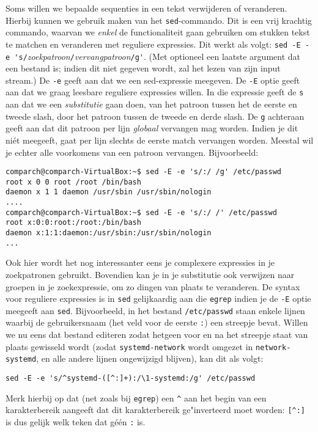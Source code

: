 \documentclass[a4paper,twoside,openany]{memoir}
\begin{document}
Soms willen we bepaalde sequenties in een tekst verwijderen of veranderen.
Hierbij kunnen we gebruik maken van het \verb!sed!-commando. Dit is een vrij
krachtig commando, waarvan we \emph{enkel} de functionaliteit gaan gebruiken om
stukken tekst te matchen en veranderen met reguliere expressies. Dit werkt als
volgt: \verb!sed -E -e 's/!\emph{zoekpatroon}\verb!/!\emph{vervangpatroon}\verb!/g'!. (Met optioneel
een laatste argument dat een bestand is; indien dit niet gegeven wordt, zal het
lezen van zijn input stream.) De \verb!-e! geeft aan dat we een sed-expressie
meegeven. De \verb!-E! optie geeft aan dat we graag leesbare reguliere expressies willen.
In die expressie geeft de \verb!s! aan dat we een \emph{substitutie}
gaan doen, van het patroon tussen het de eerste en tweede slash, door het
patroon tussen de tweede en derde slash. De \verb!g! achteraan geeft aan dat dit
patroon per lijn \emph{globaal} vervangen mag worden. Indien je dit niét
meegeeft, gaat per lijn slechts de eerste match vervangen worden. Meestal wil je
echter alle voorkomens van een patroon vervangen. Bijvoorbeeld:

\begin{verbatim}
comparch@comparch-VirtualBox:~$ sed -E -e 's/:/ /g' /etc/passwd
root x 0 0 root /root /bin/bash
daemon x 1 1 daemon /usr/sbin /usr/sbin/nologin
....
comparch@comparch-VirtualBox:~$ sed -E -e 's/:/ /' /etc/passwd
root x:0:0:root:/root:/bin/bash
daemon x:1:1:daemon:/usr/sbin:/usr/sbin/nologin
...
\end{verbatim}

Ook hier wordt het nog interessanter eens je complexere expressies in je
zoekpatronen gebruikt. Bovendien kan je in je substitutie ook verwijzen naar
groepen in je zoekexpressie, om zo dingen van plaats te veranderen.
De syntax voor reguliere expressies is in \verb!sed! gelijkaardig aan die \verb!egrep!
indien je de \verb!-E! optie meegeeft aan \verb!sed!.
Bijvoorbeeld, in het bestand \verb!/etc/passwd! staan enkele lijnen waarbij de
gebruikersnaam (het veld voor de eerste \verb!:!) een streepje bevat. Willen we
nu eens dat bestand editeren zodat hetgeen voor en na het streepje staat van
plaats gewisseld wordt (zodat \verb!systemd-network! wordt omgezet in
\verb!network-systemd!, en alle andere lijnen ongewijzigd blijven), kan dit als
volgt:

\begin{verbatim}
sed -E -e 's/^systemd-([^:]+):/\1-systemd:/g' /etc/passwd
\end{verbatim}

Merk hierbij op dat (net zoals bij \verb!egrep!) een \verb!^! aan het begin van
een karakterbereik aangeeft dat dit karakterbereik ge"inverteerd moet worden:
\verb![^:]! is dus gelijk welk teken dat géén \verb!:! is.
\end{document}
